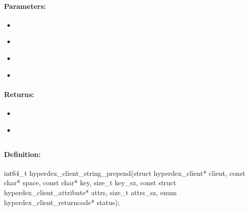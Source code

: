 \paragraph{Parameters:}
\begin{itemize}[noitemsep]
\item {}\\

\item {}\\

\item {}\\

\item {}\\

\end{itemize}

\paragraph{Returns:}
\begin{itemize}[noitemsep]
\item {}\\

\item {}\\

\end{itemize}

\pagebreak
\subsection{}
\label{api:c:string_prepend}


\paragraph{Definition:}
\begin{ccode}
int64_t hyperdex_client_string_prepend(struct hyperdex_client* client,
        const char* space,
        const char* key, size_t key_sz,
        const struct hyperdex_client_attribute* attrs, size_t attrs_sz,
        enum hyperdex_client_returncode* status);
\end{ccode}

